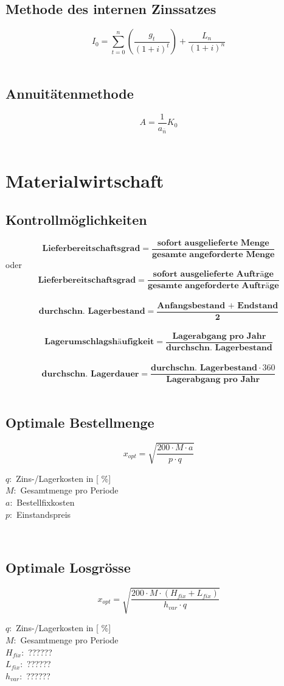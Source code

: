 \section{Methode des internen Zinssatzes}
\[
	I_0=\sum_{t=0}^{n}\left( \frac{g_t}{\left( 1+i\right) ^t} \right) + \frac{L_n}{\left( 1+i\right) ^n}
\]
\\
\section{Annuitätenmethode}
\[
	A=\frac{1}{a_{\bar{n}}}K_0
\]
\\
\chapter{Materialwirtschaft}
\section{Kontrollmöglichkeiten}
\[
		\textbf{Lieferbereitschaftsgrad}=\frac{\textbf{sofort ausgelieferte Menge}}{\textbf{gesamte angeforderte Menge}}
\]
oder\\
\[
		\textbf{Lieferbereitschaftsgrad}=\frac{\textbf{sofort ausgelieferte Aufträge}}{\textbf{gesamte angeforderte Aufträge}}
\]
\\
\[
		\textbf{durchschn. Lagerbestand}=\frac{\textbf{Anfangsbestand + Endstand}}{\textbf{2}}
\]
\\
\[
		\textbf{Lagerumschlagshäufigkeit}=\frac{\textbf{Lagerabgang pro Jahr}}{\textbf{durchschn. Lagerbestand}}
\]
\\
\[
		\textbf{durchschn. Lagerdauer}=\frac{\textbf{durchschn. Lagerbestand}\cdot 360}{\textbf{Lagerabgang pro Jahr}}
\]
\\
\section{Optimale Bestellmenge}
\[
	x_{opt}=\sqrt{\frac{200\cdot M\cdot a}{p\cdot q}}
\]
\begin{footnotesize}
	$q:$ Zins-/Lagerkosten in [ \%]\\
	$M:$ Gesamtmenge pro Periode\\
	$a:$ Bestellfixkosten\\
	$p:$ Einstandspreis\\
\end{footnotesize}
\\
\section{Optimale Losgrösse}
\[
	x_{opt}=\sqrt{\frac{200\cdot M\cdot \left( H_{fix}+L_{fix} \right)}{h_{var}\cdot q}}
\]
\begin{footnotesize}
	$q:$ Zins-/Lagerkosten in [ \%]\\
	$M:$ Gesamtmenge pro Periode\\
	$H_{fix}:$ ??????\\
	$L_{fix}:$ ??????\\
	$h_{var}:$ ??????
\end{footnotesize}